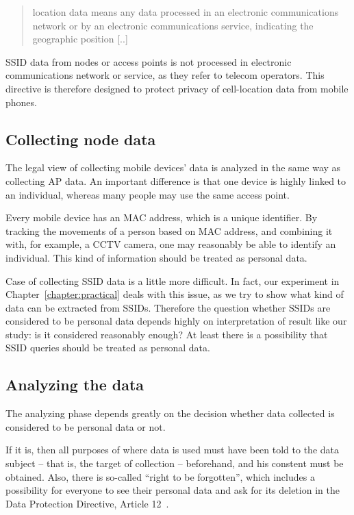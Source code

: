 \documentclass[12pt,a4paper,oneside,pdftex]{report}
\begin{document}
\begin{quote}
    location data means any data processed in an electronic communications network or by an electronic communications service, indicating the geographic position [..]
\end{quote} 

SSID data from nodes or access points is not processed in electronic communications network or service, as they refer to telecom operators. This directive is therefore designed to protect privacy of cell-location data from mobile phones.

\subsection{Collecting node data}

The legal view of collecting mobile devices' data is analyzed in the same way as collecting AP data. An important difference is that one device is highly linked to an individual, whereas many people may use the same access point.

Every mobile device has an MAC address, which is a unique identifier. By tracking the movements of a person based on MAC address, and combining it with, for example, a CCTV camera, one may reasonably be able to identify an individual. This kind of information should be treated as personal data.

Case of collecting SSID data is a little more difficult. In fact, our experiment in Chapter~\ref{chapter:practical} deals with this issue, as we try to show what kind of data can be extracted from SSIDs. Therefore the question whether SSIDs are considered to be personal data depends highly on interpretation of result like our study: is it considered reasonably enough? At least there is a possibility that SSID queries should be treated as personal data.

\subsection{Analyzing the data}

The analyzing phase depends greatly on the decision whether data collected is considered to be personal data or not. 

If it is, then all purposes of where data is used must have been told to the data subject -- that is, the target of collection -- beforehand, and his constent must be obtained. Also, there is so-called ``right to be forgotten'', which includes a possibility for everyone to see their personal data and ask for its deletion in the Data Protection Directive, Article 12~\cite{data_protection}. 
\end{document}
